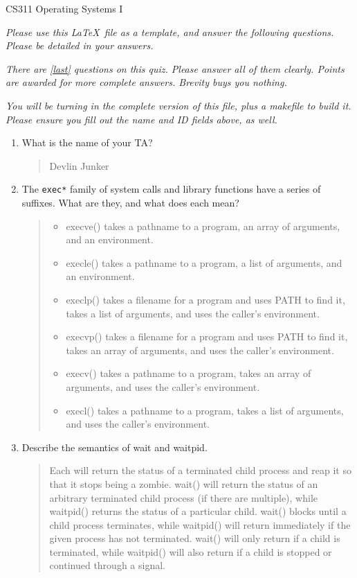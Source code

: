 \documentclass[letterpaper,10pt,onecolumn,titlepage]{article}
\begin{document}


{\Large CS311 Operating Systems I}

\emph{Please use this \LaTeX\ file as a template, and answer the following questions.
  Please be detailed in your answers.}

\emph{There are \ref{last} questions on this quiz. Please answer all of them clearly.
  Points are awarded for more complete answers. Brevity buys you nothing.}

\emph{You will be turning in the complete version of this file, plus a makefile to build
  it. Please ensure you fill out the name and ID fields above, as well.}

\begin{enumerate}%
\item What is the name of your TA?
\begin{quote}
Devlin Junker
\end{quote}

\item The \texttt{exec*} family of system calls and library functions have a series of suffixes. What are they, and what does each mean?
\begin{quote}
\begin{itemize}
\item execve() takes a pathname to a program, an array of arguments, and an environment.
\item execle() takes a pathname to a program, a list of arguments, and an environment.
\item execlp() takes a filename for a program and uses PATH to find it, takes a list of arguments, and uses the caller's environment.
\item execvp() takes a filename for a program and uses PATH to find it, takes an array of arguments, and uses the caller's environment.
\item execv() takes a pathname to a program, takes an array of arguments, and uses the caller's environment.
\item execl() takes a pathname to a program, takes a list of arguments, and uses the caller's environment.
\end{itemize}
\end{quote}

\item Describe the semantics of wait and waitpid.
\begin{quote}
Each will return the status of a terminated child process and reap it so that it stops being a zombie.  wait() will return the status of an arbitrary terminated child process (if there are multiple), while waitpid() returns the status of a particular child.  wait() blocks until a child process terminates, while waitpid() will return immediately if the given process has not terminated.  wait() will only return if a child is terminated, while waitpid() will also return if a child is stopped or continued through a signal.
\end{quote}


\end{enumerate}
\end{document}
